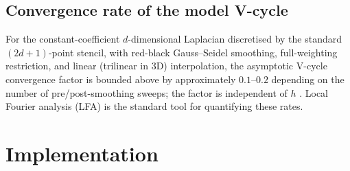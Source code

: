 \documentclass[11pt]{article}
\theoremstyle{definition}
\begin{document}
\subsection{Convergence rate of the model V-cycle}
For the constant-coefficient $d$-dimensional Laplacian discretised by
the standard $(2d{+}1)$-point stencil, with red-black Gauss--Seidel
smoothing, full-weighting restriction, and linear (trilinear in 3D)
interpolation, the asymptotic V-cycle convergence factor is bounded
above by approximately $0.1$--$0.2$ depending on the number of
pre/post-smoothing sweeps; the factor is independent of $h$
\cite[\S4]{trottenberg2001multigrid}.  Local Fourier analysis (LFA)
\cite[Appx.~A]{trottenberg2001multigrid} is the standard tool for
quantifying these rates.

\section{Implementation}\label{sec:implementation}
\end{document}
